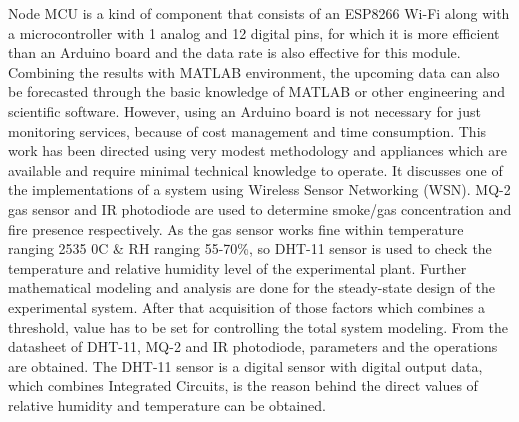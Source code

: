 Node MCU is a kind of component that consists of an ESP8266 Wi-Fi along with a microcontroller with 1 analog and 12 digital pins, for which it is more efficient than an Arduino board and the data rate is also effective for this module. Combining the results with MATLAB environment, the upcoming data can also be forecasted through the basic knowledge of MATLAB or other engineering and scientific software. However, using an Arduino board is not necessary for just monitoring services, because of cost management and time consumption. This work has been directed using very modest methodology and appliances which are available and require minimal technical knowledge to operate. It discusses one of the implementations of a system using Wireless Sensor Networking (WSN). MQ-2 gas sensor and IR photodiode are used to determine smoke/gas concentration and fire presence respectively. As the gas sensor works fine within temperature ranging 2535 0C \& RH ranging 55-70\%, so DHT-11 sensor is used to check the temperature and relative humidity level of the experimental plant. Further mathematical modeling and analysis are done for the steady-state design of the experimental system. After that acquisition of those factors which combines a threshold, value has to be set for controlling the total system modeling. From the datasheet of DHT-11, MQ-2 and IR photodiode, parameters and the operations are obtained. The DHT-11 sensor is a digital sensor with digital output data, which combines Integrated Circuits, is the reason behind the direct values of relative humidity and temperature can be obtained.

